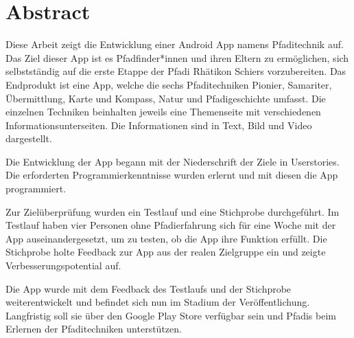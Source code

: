 \chapter*{Abstract}

Diese Arbeit zeigt die Entwicklung einer Android App namens Pfaditechnik auf. Das Ziel dieser App ist es Pfadfinder*innen und ihren Eltern zu ermöglichen, sich selbstständig auf die erste Etappe der Pfadi Rhätikon Schiers vorzubereiten. Das Endprodukt ist eine App, welche die sechs Pfaditechniken Pionier, Samariter, Übermittlung, Karte und Kompass, Natur und Pfadigeschichte umfasst. Die einzelnen Techniken beinhalten jeweils eine Themenseite mit verschiedenen Informationsunterseiten. Die Informationen sind in Text, Bild und Video dargestellt. \par
Die Entwicklung der App begann mit der Niederschrift der Ziele in Userstories. Die erforderten Programmierkenntnisse wurden erlernt und mit diesen die App programmiert. \par
Zur Zielüberprüfung wurden ein Testlauf und eine Stichprobe durchgeführt. Im Testlauf haben vier Personen ohne Pfadierfahrung sich für eine Woche mit der App auseinandergesetzt, um zu testen, ob die App ihre Funktion erfüllt. Die Stichprobe holte Feedback zur App aus der realen Zielgruppe ein und zeigte Verbesserungspotential auf. \par
Die App wurde mit dem Feedback des Testlaufs und der Stichprobe weiterentwickelt und befindet sich nun im Stadium der Veröffentlichung. Langfristig soll sie über den Google Play Store verfügbar sein und Pfadis beim Erlernen der Pfaditechniken unterstützen.